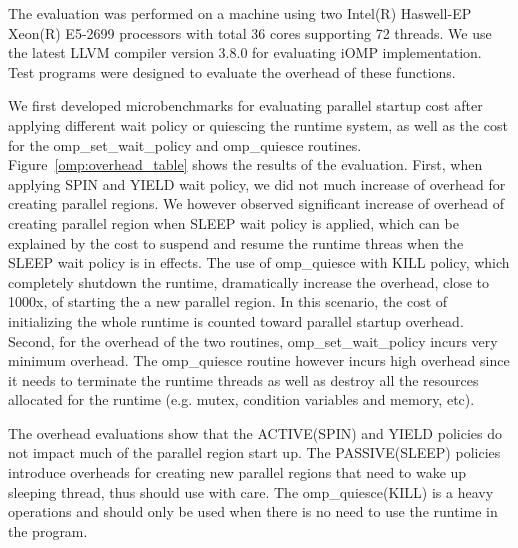 The evaluation was performed on a machine using two Intel(R) Haswell-EP Xeon(R) E5-2699 processors with total 36 cores supporting 72 threads. We use the latest
LLVM compiler version 3.8.0 for evaluating iOMP implementation. Test programs were designed to evaluate the overhead of these functions. 

We first developed microbenchmarks for evaluating parallel startup cost after applying different wait policy or 
quiescing the runtime system, as well as the cost for the {\sf omp\_set\_wait\_policy} and {\sf omp\_quiesce} 
routines.  
Figure~\ref{omp:overhead_table} shows the results of the evaluation. 
First, when applying SPIN and YIELD wait policy, we did not much increase of overhead for creating 
parallel regions. We however observed significant increase of overhead of creating parallel region when SLEEP
wait policy is applied, which can be explained by the cost to suspend and resume the runtime threas when the 
SLEEP wait policy is in effects. The use of {\sf omp\_quiesce} with KILL policy, which completely shutdown the 
runtime, dramatically increase the overhead, close to 1000x, of starting the a new parallel region. In this 
scenario, the cost of initializing the whole runtime is counted toward {\sf parallel} startup overhead. Second, 
for the overhead of the two routines, {\sf omp\_set\_wait\_policy} incurs very minimum overhead. The 
{\sf omp\_quiesce} routine however incurs high overhead since it needs to terminate the runtime threads as well as 
destroy all the resources allocated for the runtime (e.g. mutex, condition variables and memory, etc). 

The overhead evaluations show that the ACTIVE(SPIN) and YIELD policies do not impact much of the {\sf parallel} 
region start up. The PASSIVE(SLEEP) policies introduce overheads for creating new parallel regions that need to wake up sleeping thread, thus should use with care. The {\sf omp\_quiesce(KILL)} is a heavy operations and should only be
used when there is no need to use the runtime in the program. 


